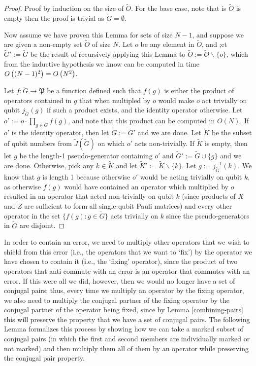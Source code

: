 \documentclass[twocolumn,showpacs,preprintnumbers,amsmath,amssymb,nofootinbib,pra,floatfix]{revtex4-1}
\newenvironment{remark}[1][Remark]{\begin{trivlist}
\item[\hskip \labelsep {\bfseries #1}]}{\end{trivlist}}
\newcommand{\set}{\tilde}
\newcommand{\pauligroup}{\mathfrak{P}}
\begin{document}
\begin{proof}
Proof by induction on the size of $\set O$.  For the base case, note that is $\set O$ is empty then the proof is trivial as $\set G=\emptyset$.

Now assume we have proven this Lemma for sets of size $N-1$, and suppose we are given a non-empty set $\set O$ of size $N$.  Let $o$ be any element in $\set O$, and ;et $\set G':=\set G$ be the result of recursively applying this Lemma to $\set O:=\set O\backslash\{o\}$, which from the inductive hypothesis we know can be computed in time $O\left((N-1)^2\right)=O\left(N^2\right)$.

Let $f:\set G\to\pauligroup$ be a function defined such that $f(g)$ is either the product of operators contained in $g$ that when multipled by $o$ would make $o$ act trivially on qubit $j_{\set G}(g)$ if such a product exists, and the identity operator otherwise.  Let $o':=o\cdot\prod_{g\in\set G}f(g)$, and note that this product can be computed in $O(N)$.  If $o'$ is the identity operator, then let $\set G:=\set G'$ and we are done.  Let $\set K$ be the subset of qubit numbers from $\set J(\set G)$ on which $o'$ acts non-trivially.  If $\set K$ is empty, then let $g$ be the length-1 pseudo-generator containing $o'$ and $\set G':=\set G\cup\{g\}$ and we are done.  Otherwise, pick any $k\in\set K$ and let $\set K':=\set K\backslash\{k\}$.  Let $g:=j^{-1}_{\set G}(k)$.  We know that $g$ is length 1 because otherwise $o'$ would be acting trivially on qubit $k$, as otherwise $f(g)$ would have contained an operator which multiplied by $o$ resulted in an operator that acted non-trivially on qubit $k$ (since products of $X$ and $Z$ are sufficient to form all single-qubit Pauli matrices) and every other operator in the set $\{f(g) : g\in\set G\}$ acts trivially on $k$ since the pseudo-generators in $\set G$ are disjoint.
\end{proof}
\begin{remark}
In order to contain an error, we need to multiply other operators that we wish to shield from this error (i.e., the operators that we want to `fix') by the operator we have chosen to contain it (i.e., the `fixing' operator), since the product of two operators that anti-commute with an error is an operator that commutes with an error.  If this were all we did, however, then we would no longer have a set of conjugal pairs;  thus, every time we multiply an operator by the fixing operator, we also need to multiply the conjugal partner of the fixing operator by the conjugal partner of the operator being fixed, since by Lemma \ref{combining-pairs} this will preserve the property that we have a set of conjugal pairs.  The following Lemma formalizes this process by showing how we can take a marked subset of conjugal pairs (in which the first and second members are individually marked or not marked) and then multiply them all of them by an operator while preserving the conjugal pair property. 
\end{remark}
\end{document}
